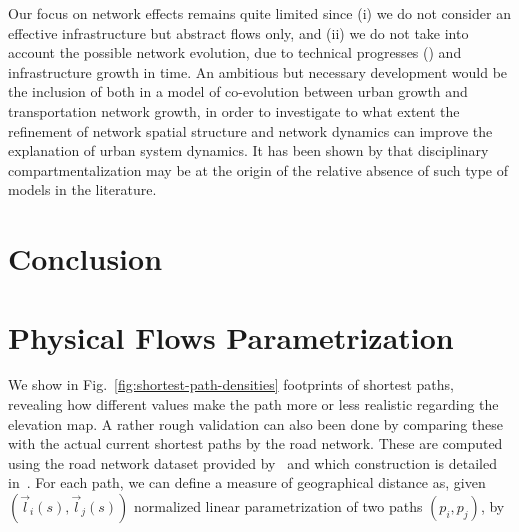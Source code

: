 \documentclass[Royal,sageh,times]{sagej}
\begin{document}
Our focus on network effects remains quite limited since (i) we do not consider an effective infrastructure but abstract flows only, and (ii) we do not take into account the possible network evolution, due to technical progresses (\cite{bretagnolle2000long}) and infrastructure growth in time. An ambitious but necessary development would be the inclusion of both in a model of co-evolution between urban growth and transportation network growth, in order to investigate to what extent the refinement of network spatial structure and network dynamics can improve the explanation of urban system dynamics. It has been shown by \cite{raimbault2016models} that disciplinary compartmentalization may be at the origin of the relative absence of such type of models in the literature.




\section*{Conclusion}


















\section*{Physical Flows Parametrization}

We show in Fig.~\ref{fig:shortest-path-densities} footprints of shortest paths, revealing how different values make the path more or less realistic regarding the elevation map. A rather rough validation can also been done by comparing these with the actual current shortest paths by the road network. These are computed using the road network dataset provided by~\cite{} %
and which construction is detailed in~\cite{}. %
For each path, we can define a measure of geographical distance as, given $(\vec{l}_i (s), \vec{l}_j (s))$ normalized linear parametrization of two paths $(p_i,p_j)$, by
\end{document}
